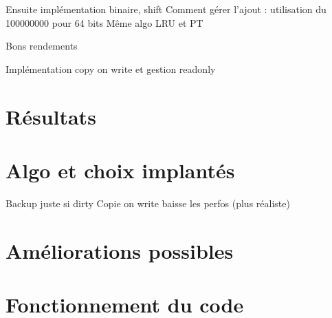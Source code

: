 \documentclass{article}
\begin{document}
Ensuite implémentation binaire, shift
Comment gérer l’ajout : utilisation du 100000000 pour 64 bits 
Même algo LRU et PT

Bons rendements

Implémentation copy on write et gestion readonly

\section{Résultats}


\section{Algo et choix implantés}
Backup juste si dirty
Copie on write baisse les perfos (plus réaliste)
\section{Améliorations possibles}


\section{Fonctionnement du code}
\end{document}

